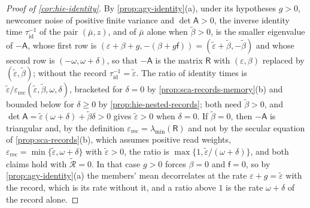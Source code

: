 \begin{proof}[Proof of \cref{cor:hie-identity}]
By \cref{prop:agy-identity}(a), under its hypotheses $g>0$, newcomer noise of positive finite variance and $\det\mathsf A>0$, the inverse identity time $\tau_{\mathrm{id}}^{-1}$ of the pair $(\bar\mu,z)$, and of $\bar\mu$ alone when $\tilde\beta>0$, is the smaller eigenvalue of $-\mathsf A$, whose first row is $(\varepsilon+\beta+g,-(\beta+g\mathsf f))=(\tilde\varepsilon+\tilde\beta,-\tilde\beta)$ and whose second row is $(-\omega,\omega+\delta)$, so that $-\mathsf A$ is the matrix $\mathsf R$ with $(\varepsilon,\beta)$ replaced by $(\tilde\varepsilon,\tilde\beta)$; without the record $\tau_{\mathrm{id}}^{-1}=\tilde\varepsilon$. The ratio of identity times is $\tilde\varepsilon/\varepsilon_{\mathrm{rec}}(\tilde\varepsilon,\tilde\beta,\omega,\delta)$, bracketed for $\delta=0$ by \cref{prop:sca-records-memory}(b) and bounded below for $\delta\ge0$ by \cref{prop:hie-nested-records}; both need $\tilde\beta>0$, and $\det\mathsf A=\tilde\varepsilon(\omega+\delta)+\tilde\beta\delta>0$ gives $\tilde\varepsilon>0$ when $\delta=0$. If $\tilde\beta=0$, then $-\mathsf A$ is triangular and, by the definition $\varepsilon_{\mathrm{rec}}=\lambda_{\min}(\mathsf R)$ and not by the secular equation of \cref{prop:sca-records}(b), which assumes positive read weights, $\varepsilon_{\mathrm{rec}}=\min\{\tilde\varepsilon,\omega+\delta\}$ with $\tilde\varepsilon>0$, the ratio is $\max\{1,\tilde\varepsilon/(\omega+\delta)\}$, and both claims hold with $\tilde{\mathcal R}=0$. In that case $g>0$ forces $\beta=0$ and $\mathsf f=0$, so by \cref{prop:agy-identity}(a) the members' mean decorrelates at the rate $\varepsilon+g=\tilde\varepsilon$ with the record, which is its rate without it, and a ratio above $1$ is the rate $\omega+\delta$ of the record alone.
\end{proof}

